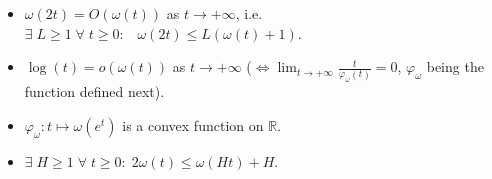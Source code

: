\documentclass[10pt]{amsart}%
\numberwithin{equation}{section}
\theoremstyle{plain}
\newcommand{\RR}{\mathbb{R}}
\newcommand{\NN}{\mathbb{N}}
\begin{document}
\begin{itemize}
\item[\hypertarget{om1}{$(\omega_1)}$] $\omega(2t)=O(\omega(t))$ as $t\rightarrow+\infty$, i.e. $\exists\;L\ge 1\;\forall\;t\ge 0:\;\;\;\omega(2t)\le L(\omega(t)+1)$.


\item[\hypertarget{om3}{$(\omega_3)$}] $\log(t)=o(\omega(t))$ as $t\rightarrow+\infty$ ($\Leftrightarrow\lim_{t\rightarrow+\infty}\frac{t}{\varphi_{\omega}(t)}=0$, $\varphi_{\omega}$ being the function defined next).

\item[\hypertarget{om4}{$(\omega_4)$}] $\varphi_{\omega}:t\mapsto\omega(e^t)$ is a convex function on $\RR$.


\item[\hypertarget{om6}{$(\omega_6)$}] $\exists\;H\ge 1\;\forall\;t\ge 0:\;2\omega(t)\le\omega(H t)+H$.



\end{itemize}

\end{document}
